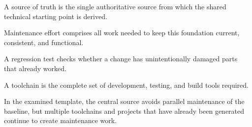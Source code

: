 \begin{beginnerstatement}

A source of truth is the single authoritative source from which the shared
technical starting point is derived.

Maintenance effort comprises all work needed to keep this foundation current,
consistent, and functional.

A regression test checks whether a change has unintentionally damaged parts
that already worked.

A toolchain is the complete set of development, testing, and build tools
required.

In the examined template, the central source avoids parallel maintenance of
the baseline, but multiple toolchains and projects that have already been
generated continue to create maintenance work.

\end{beginnerstatement}

